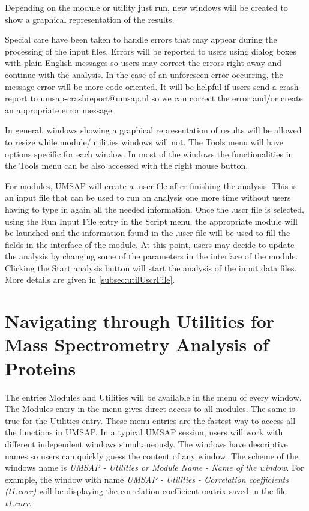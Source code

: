 Depending on the module or utility just run, new windows will be created to show a graphical representation of the results.

Special care have been taken to handle errors that may appear during the processing of the input files. Errors will be reported to users using dialog boxes with plain English messages so users may correct the errors right away and continue with the analysis. In the case of an unforeseen error occurring, the message error will be more code oriented. It will be helpful if users send a crash report to umsap-crashreport@umsap.nl so we can correct the error and/or create an appropriate error message. 

In general, windows showing a graphical representation of results will be allowed to resize while module/utilities windows will not. The Tools menu will have options specific for each window. In most of the windows the functionalities in the Tools menu can be also accessed with the right mouse button.

For modules, UMSAP will create a .uscr\label{par:uscrFile} file after finishing the analysis. This is an input file that can be used to run an analysis one more time without users having to type in again all the needed information. Once the .uscr file is selected, using the Run Input File entry in the Script menu, the appropriate module will be launched and the information found in the .uscr file will be used to fill the fields in the interface of the module. At this point, users may decide to update the analysis by changing some of the parameters in the interface of the module. Clicking the Start analysis button will start the analysis of the input data files. More details are given in \autoref{subsec:utilUscrFile}.  

\section{Navigating through Utilities for Mass Spectrometry Analysis of Proteins}

The entries Modules and Utilities will be available in the menu of every window. The Modules entry in the menu gives direct access to all modules. The same is true for the Utilities entry. These menu entries are the fastest way to access all the functions in UMSAP. In a typical UMSAP session, users will work with different independent windows simultaneously. The windows have descriptive names so users can quickly guess the content of any window. The scheme of the windows name is \textit{UMSAP - Utilities or Module Name - Name of the window}. For example, the window with name \textit{UMSAP - Utilities - Correlation coefficients (t\num[detect-all]{1}.corr)} will be displaying the correlation coefficient matrix saved in the file \textit{t\num{1}.corr}.


